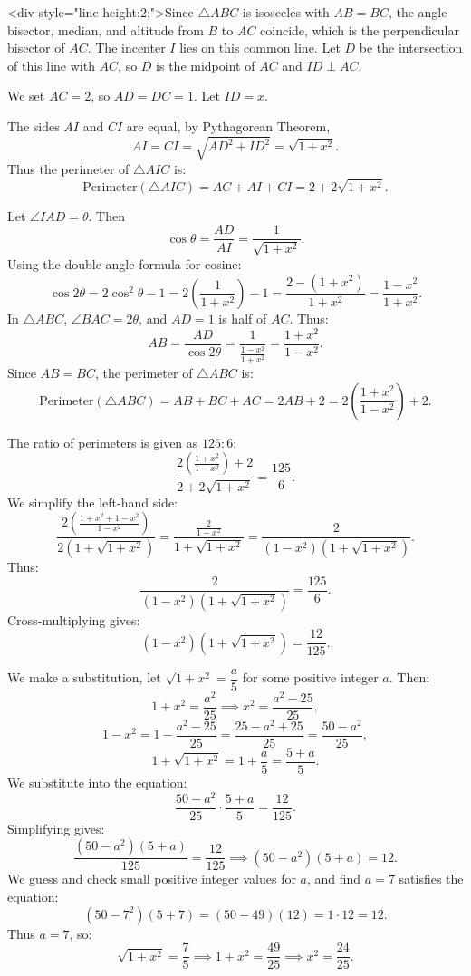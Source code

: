 \begin{enumerate}
<div style="line-height:2;">Since $\triangle ABC$ is isosceles with $AB = BC$, the angle bisector, median, and altitude from $B$ to $AC$ coincide, which is the perpendicular bisector of $AC$. The incenter $I$ lies on this common line. Let $D$ be the intersection of this line with $AC$, so $D$ is the midpoint of $AC$ and $ID \perp AC$.

 We set $AC = 2$, so $AD = DC = 1$. Let $ID = x$.

 The sides \(AI\) and \(CI\) are equal, by Pythagorean Theorem,
 \[AI = CI = \sqrt{AD^2 + ID^2} = \sqrt{1 + x^2}.\]Thus the perimeter of \(\triangle AIC\) is:
 \[\text{Perimeter}(\triangle AIC) = AC + AI + CI = 2 + 2\sqrt{1 + x^2}.\]

 Let \(\angle IAD = \theta\). Then
 \[\cos\theta = \frac{AD}{AI} = \frac{1}{\sqrt{1 + x^2}}.\]Using the double-angle formula for cosine:
 \[\cos 2\theta = 2\cos^2\theta - 1 = 2\left(\frac{1}{1 + x^2}\right) - 1 = \frac{2 - (1 + x^2)}{1 + x^2} = \frac{1 - x^2}{1 + x^2}.\]In \(\triangle ABC\), \(\angle BAC = 2\theta\), and \(AD = 1\) is half of \(AC\). Thus:
 \[AB = \frac{AD}{\cos 2\theta} = \frac{1}{\frac{1 - x^2}{1 + x^2}} = \frac{1 + x^2}{1 - x^2}.\]Since \(AB = BC\), the perimeter of \(\triangle ABC\) is:
 \[\text{Perimeter}(\triangle ABC) = AB + BC + AC = 2AB + 2 = 2\left(\frac{1 + x^2}{1 - x^2}\right) + 2.\]

 The ratio of perimeters is given as \(125:6\):
 \[\frac{2\left(\frac{1 + x^2}{1 - x^2}\right) + 2}{2 + 2\sqrt{1 + x^2}} = \frac{125}{6}.\]We simplify the left-hand side:
 \[\frac{2\left(\frac{1 + x^2 + 1 - x^2}{1 - x^2}\right)}{2(1 + \sqrt{1 + x^2})} = \frac{\frac{2}{1 - x^2}}{1 + \sqrt{1 + x^2}} = \frac{2}{(1 - x^2)(1 + \sqrt{1 + x^2})}.\]Thus:
 \[\frac{2}{(1 - x^2)(1 + \sqrt{1 + x^2})} = \frac{125}{6}.\]Cross-multiplying gives:
 \[(1 - x^2)(1 + \sqrt{1 + x^2}) = \frac{12}{125}.\]

 We make a substitution, let \(\sqrt{1 + x^2} = \dfrac{a}{5}\) for some positive integer \(a\). Then:
 \[1 + x^2 = \frac{a^2}{25} \implies x^2 = \frac{a^2 - 25}{25},\]
 \[1 - x^2 = 1 - \frac{a^2 - 25}{25} = \frac{25 - a^2 + 25}{25} = \frac{50 - a^2}{25},\]
 \[1 + \sqrt{1 + x^2} = 1 + \frac{a}{5} = \frac{5 + a}{5}.\]We substitute into the equation:
 \[\frac{50 - a^2}{25} \cdot \frac{5 + a}{5} = \frac{12}{125}.\]Simplifying gives:
 \[\frac{(50 - a^2)(5 + a)}{125} = \frac{12}{125} \implies (50 - a^2)(5 + a) = 12.\]We guess and check small positive integer values for \(a\), and find \(a = 7\) satisfies the equation:
 \[(50 - 7^2)(5 + 7) = (50 - 49)(12) = 1 \cdot 12 = 12.\]Thus \(a = 7\), so:
 \[\sqrt{1 + x^2} = \frac{7}{5} \implies 1 + x^2 = \frac{49}{25} \implies x^2 = \frac{24}{25}.\]


\end{enumerate}
